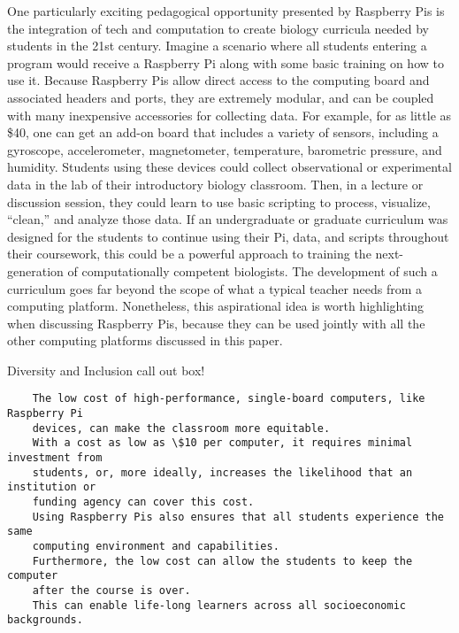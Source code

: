 One particularly exciting pedagogical opportunity presented by Raspberry Pis is
the integration of tech and computation to create biology curricula needed by
students in the 21st century.
Imagine a scenario where all students entering a program would receive a
Raspberry Pi along with some basic training on how to use it.
Because Raspberry Pis allow direct access to the computing board and
associated headers and ports, they are extremely modular, and can be coupled
with many inexpensive accessories for collecting data.
For example, for as little as \$40, one can get an add-on board that includes
a variety of sensors, including a gyroscope, accelerometer, magnetometer,
temperature, barometric pressure, and humidity.
Students using these devices could collect observational or
experimental data in the lab of their introductory biology classroom.
Then, in a lecture or discussion session, they could learn to use basic
scripting to process, visualize, ``clean,'' and analyze those data.
If an undergraduate or graduate curriculum was designed for the students to
continue using their Pi, data, and scripts throughout their coursework, this
could be a powerful approach to training the next-generation of computationally
competent biologists.
The development of such a curriculum goes far beyond the scope of what a
typical teacher needs from a computing platform.
Nonetheless, this aspirational idea is worth highlighting when discussing
Raspberry Pis, because they can be used jointly with all the other computing platforms
discussed in this paper.


{\begin{framed}
Diversity and Inclusion call out box! 
\begin{snugshade*}
\begin{lstlisting}
    The low cost of high-performance, single-board computers, like Raspberry Pi
    devices, can make the classroom more equitable.
    With a cost as low as \$10 per computer, it requires minimal investment from
    students, or, more ideally, increases the likelihood that an institution or
    funding agency can cover this cost.
    Using Raspberry Pis also ensures that all students experience the same
    computing environment and capabilities.
    Furthermore, the low cost can allow the students to keep the computer
    after the course is over.
    This can enable life-long learners across all socioeconomic backgrounds.
\end{lstlisting}
\end{snugshade*}
\end{framed}}

